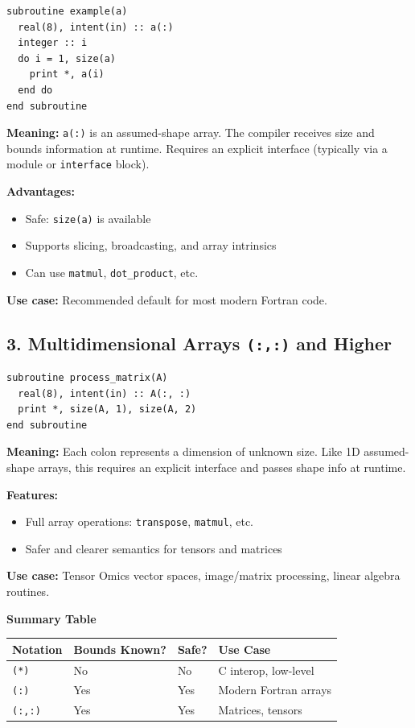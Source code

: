 \documentclass{article}
\begin{document}
\begin{verbatim}
subroutine example(a)
  real(8), intent(in) :: a(:)
  integer :: i
  do i = 1, size(a)
    print *, a(i)
  end do
end subroutine
\end{verbatim}

\textbf{Meaning:} \texttt{a(:)} is an assumed-shape array. The compiler receives size and bounds information at runtime. Requires an explicit interface (typically via a module or \texttt{interface} block).

\textbf{Advantages:}
\begin{itemize}
  \item Safe: \texttt{size(a)} is available
  \item Supports slicing, broadcasting, and array intrinsics
  \item Can use \texttt{matmul}, \texttt{dot\_product}, etc.
\end{itemize}

\textbf{Use case:} Recommended default for most modern Fortran code.


\subsection{3. Multidimensional Arrays \texttt{(:,:)} and Higher}

\begin{verbatim}
subroutine process_matrix(A)
  real(8), intent(in) :: A(:, :)
  print *, size(A, 1), size(A, 2)
end subroutine
\end{verbatim}

\textbf{Meaning:} Each colon represents a dimension of unknown size. Like 1D assumed-shape arrays, this requires an explicit interface and passes shape info at runtime.

\textbf{Features:}
\begin{itemize}
  \item Full array operations: \texttt{transpose}, \texttt{matmul}, etc.
  \item Safer and clearer semantics for tensors and matrices
\end{itemize}

\textbf{Use case:} Tensor Omics vector spaces, image/matrix processing, linear algebra routines.

\vspace{1em}

\noindent\textbf{Summary Table}

\begin{tabular}{|l|l|l|l|}
\hline
Notation & Bounds Known? & Safe? & Use Case \\
\hline
\texttt{(*)} & No  & No  & C interop, low-level \\
\texttt{(:)} & Yes & Yes & Modern Fortran arrays \\
\texttt{(:,:)} & Yes & Yes & Matrices, tensors \\
\hline
\end{tabular}
\end{document}
